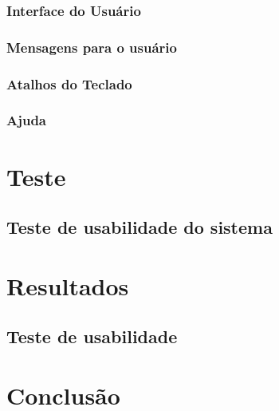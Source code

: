 \documentclass[
	12pt,				%
	openright,			%
	twoside,			%
	a4paper,			%
	english,			%
	brazil				%
	]{abntex2}
\begin{document}
		\subsection{Interface do Usuário}
		\subsection{Mensagens para o usuário}
		\subsection{Atalhos do Teclado}
		\subsection{Ajuda}

\chapter{Teste}
\section{Teste de usabilidade do sistema}
\chapter{Resultados}
\section{Teste de usabilidade}
\chapter{Conclusão}

\lipsum[31-33]

\postextual


\end{document}
